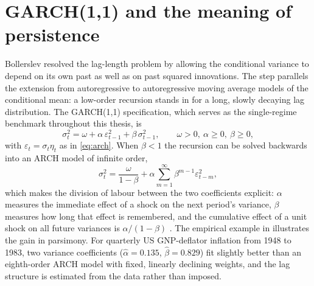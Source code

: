 \section{GARCH(1,1) and the meaning of persistence}\label{sec:garch}

Bollerslev resolved the lag-length problem by allowing the conditional variance to depend on its own past as well as on past squared innovations. The step parallels the extension from autoregressive to autoregressive moving average models of the conditional mean: a low-order recursion stands in for a long, slowly decaying lag distribution. The GARCH(1,1) specification, which serves as the single-regime benchmark throughout this thesis, is
\begin{equation}\label{eq:garch11}
  \sigma_t^2 = \omega + \alpha\,\varepsilon_{t-1}^2 + \beta\,\sigma_{t-1}^2,
  \qquad \omega > 0,\ \alpha \ge 0,\ \beta \ge 0,
\end{equation}
with $\varepsilon_t = \sigma_t \eta_t$ as in \eqref{eq:arch}. When $\beta < 1$ the recursion can be solved backwards into an ARCH model of infinite order,
\begin{equation}\label{eq:archinf}
  \sigma_t^2 = \frac{\omega}{1-\beta} + \alpha \sum_{m=1}^{\infty} \beta^{m-1} \varepsilon_{t-m}^2 ,
\end{equation}
which makes the division of labour between the two coefficients explicit: $\alpha$ measures the immediate effect of a shock on the next period's variance, $\beta$ measures how long that effect is remembered, and the cumulative effect of a unit shock on all future variances is $\alpha/(1-\beta)$ \parencite{haasetal2004}.
The empirical example in \textcite{bollerslev1986} illustrates the gain in parsimony. For quarterly US GNP-deflator inflation from 1948 to 1983, two variance coefficients ($\hat\alpha = 0.135$, $\hat\beta = 0.829$) fit slightly better than an eighth-order ARCH model with fixed, linearly declining weights, and the lag structure is estimated from the data rather than imposed.

